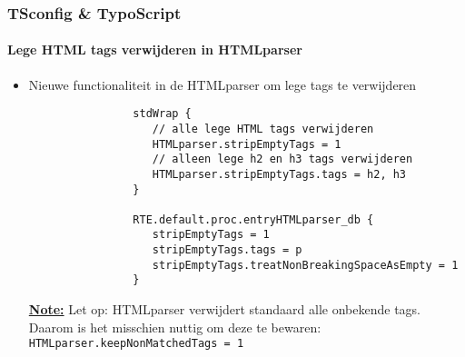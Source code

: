 \begin{frame}[fragile]
	\frametitle{TSconfig \& TypoScript}
	\framesubtitle{Lege HTML tags verwijderen in HTMLparser}

	\lstset{basicstyle=\tiny\ttfamily}

	\begin{itemize}
		\item Nieuwe functionaliteit in de HTMLparser om lege tags te verwijderen

			\begin{lstlisting}
				stdWrap {
				   // alle lege HTML tags verwijderen
				   HTMLparser.stripEmptyTags = 1
				   // alleen lege h2 en h3 tags verwijderen
				   HTMLparser.stripEmptyTags.tags = h2, h3
				}

				RTE.default.proc.entryHTMLparser_db {
				   stripEmptyTags = 1
				   stripEmptyTags.tags = p
				   stripEmptyTags.treatNonBreakingSpaceAsEmpty = 1
				}
			\end{lstlisting}

			\underline{\textbf{Note:}}
				Let op: HTMLparser verwijdert standaard alle onbekende tags.\newline
				Daarom is het misschien nuttig om deze te bewaren:\newline
				\texttt{HTMLparser.keepNonMatchedTags = 1}

	\end{itemize}

\end{frame}

